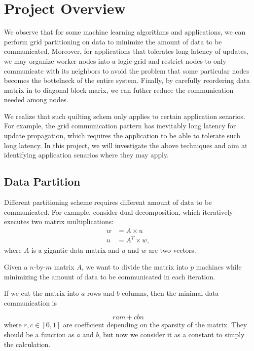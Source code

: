 \documentclass{acm_proc_article-sp}
\begin{document}
\appendix
\section{Project Overview}

We observe that for some machine learning algorithms and applications, we can
perform grid partitioning on data to minimize the amount of data to be
communicated. Moreover, for applications that tolerates long latency of updates,
we may organize worker nodes into a logic grid and restrict nodes to only
communicate with its neighbors to avoid the problem that some particular nodes
becomes the bottelneck of the entire system. Finally, by carefully reordering
data matrix in to diagonal block marix, we can futher reduce the
communication needed among nodes.

We realize that such quilting schem only applies to certain application
senarios. For example, the grid communication pattern has inevitably long
latency for update propagation, which requires the application to be able to
tolerate such long latency. In this project, we will investigate the above
techniques and aim at identifying application senarios where they may apply.

\subsection{Data Partition}
Different partitioning scheme requires different amount of data to be
communicated. For example, consider dual decomposition,
which iteratively executes two matrix multiplications:
\begin{align*}
w &= A \times u \\
u &= A^T \times w,
\end{align*}
where $A$ is a gigantic data matrix and $u$ and $w$ are two vectors.

Given a $n$-by-$m$ matrix $A$, we want to divide the matrix into $p$ machines
while minimizing the amount of data to be communicated in each iteration.

If we cut the matrix into $a$ rows and $b$ columns, then the minimal data
communication is

\begin{equation}
  r  am +  c bn
  \label{eq:total-traffic}
\end{equation}
where $r,c \in [0,1]$ are coefficient depending on the sparsity of the
matrix. They should be a function as $a$ and $b$, but now we consider it as a
constant to simply the calculation.
\end{document}
